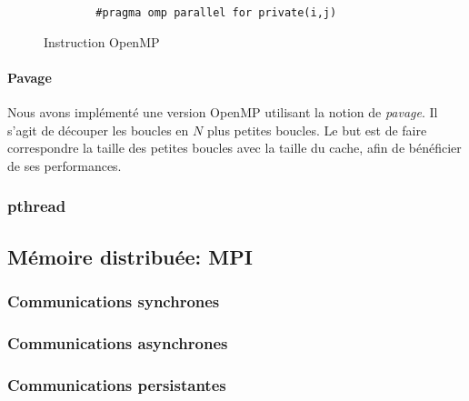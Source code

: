 \begin{figure}[h!]
	\begin{lstlisting}
		#pragma omp parallel for private(i,j)
	\end{lstlisting}
	\caption{Instruction OpenMP}
	\label{omp_parallel}
\end{figure}

\paragraph{Pavage}
Nous avons implémenté une version OpenMP utilisant la notion de \emph{pavage}. Il s'agit de découper les boucles en $N$ plus petites boucles. Le but est de faire correspondre la taille des petites boucles avec la taille du cache, afin de bénéficier de ses performances. 

\subsubsection{pthread}
\label{pthread}


\subsection{Mémoire distribuée: MPI} %
\label{mpi}


\subsubsection{Communications synchrones}
\subsubsection{Communications asynchrones}
\subsubsection{Communications persistantes}
